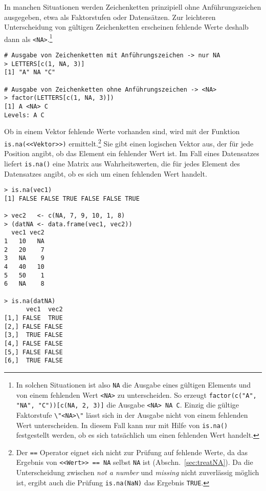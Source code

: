 In manchen Situationen werden Zeichenketten prinzipiell ohne Anführungszeichen ausgegeben, etwa als Faktorstufen oder Datensätzen. Zur leichteren Unterscheidung von gültigen Zeichenketten erscheinen fehlende Werte deshalb dann als \lstinline!<NA>!.\footnote{In solchen Situationen ist also \lstinline!NA! die Ausgabe eines gültigen Elements und von einem fehlenden Wert \lstinline!<NA>! zu unterscheiden. So erzeugt \lstinline!factor(c("A", "NA", "C"))[c(NA, 2, 3)]! die Ausgabe \lstinline!<NA> NA C!. Einzig die gültige Faktorstufe \lstinline!\"<NA>\"! lässt sich in der Ausgabe nicht von einem fehlenden Wert unterscheiden. In diesem Fall kann nur mit Hilfe von \lstinline!is.na()! festgestellt werden, ob es sich tatsächlich um einen fehlenden Wert handelt.}
\begin{lstlisting}
# Ausgabe von Zeichenketten mit Anführungszeichen -> nur NA
> LETTERS[c(1, NA, 3)]
[1] "A" NA "C"

# Ausgabe von Zeichenketten ohne Anführungszeichen -> <NA>
> factor(LETTERS[c(1, NA, 3)])
[1] A <NA> C
Levels: A C
\end{lstlisting}

Ob in einem Vektor fehlende Werte vorhanden sind, wird mit der Funktion \lstinline!is.na(<<Vektor>>)! ermittelt.\footnote{Der \lstinline!==! Operator eignet sich nicht zur Prüfung auf fehlende Werte, da das Ergebnis von \lstinline!<<Wert>> == NA! selbst \lstinline!NA! ist (Abschn.\ \ref{sec:treatNA}). Da die Unterscheidung zwischen \emph{not a number} und \emph{missing} nicht zuverlässig möglich ist, ergibt auch die Prüfung \lstinline!is.na(NaN)! das Ergebnis \lstinline!TRUE!.} Sie gibt einen logischen Vektor aus, der für jede Position angibt, ob das Element ein fehlender Wert ist. Im Fall eines Datensatzes liefert \lstinline!is.na()! eine Matrix aus Wahrheitswerten, die für jedes Element des Datensatzes angibt, ob es sich um einen fehlenden Wert handelt.
\begin{lstlisting}
> is.na(vec1)
[1] FALSE FALSE TRUE FALSE FALSE TRUE

> vec2   <- c(NA, 7, 9, 10, 1, 8)
> (datNA <- data.frame(vec1, vec2))
  vec1 vec2
1   10   NA
2   20    7
3   NA    9
4   40   10
5   50    1
6   NA    8

> is.na(datNA)
      vec1  vec2
[1,] FALSE  TRUE
[2,] FALSE FALSE
[3,]  TRUE FALSE
[4,] FALSE FALSE
[5,] FALSE FALSE
[6,]  TRUE FALSE
\end{lstlisting}

